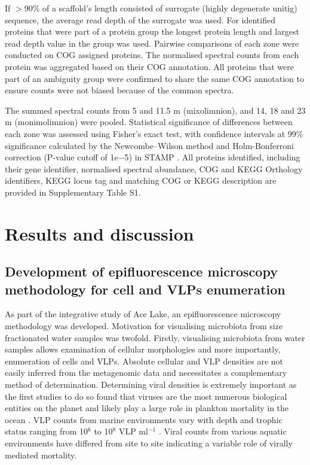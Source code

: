 If $>$90\% of a scaffold’s length consisted of surrogate (highly degenerate unitig) sequence, the average read depth of the surrogate was used. 
For identified proteins that were part of a protein group the longest protein length and largest read depth value in the group was used. 
Pairwise comparisons of each zone were conducted on \ac{COG} assigned proteins. 
The normalised spectral counts from each protein was aggregated based on their \ac{COG} annotation. 
All proteins that were part of an ambiguity group were confirmed to share the same \ac{COG} annotation to ensure counts were not biased because of the common spectra.

The summed spectral counts from 5 and 11.5 m (mixolimnion), and 14, 18 and 23 m (monimolimnion) were pooled. 
Statistical significance of differences between each zone was assessed using Fisher's exact test, with confidence intervals at 99\% significance calculated by the Newcombe–Wilson method and Holm-Bonferroni correction (P-value cutoff of 1e$-$5) in \ac{STAMP} \cite{Parks2010}. 
All proteins identified, including their gene identifier, normalised spectral abundance, \ac{COG} and \ac{KEGG} Orthology identifiers, \ac{KEGG} locus tag and matching \ac{COG} or \ac{KEGG} description are provided in Supplementary Table S1.




\section{Results and discussion}

\subsection[Epifluorescence microscopy methodology]{Development of epifluorescence microscopy methodology for cell and \acp{VLP} enumeration}
As part of the integrative study of Ace Lake, an epifluorescence microscopy methodology was developed.
Motivation for visualising microbiota from size fractionated water samples was twofold. 
Firstly, visualising microbiota from water samples allows examination of cellular morphologies and more importantly, enumeration of cells and \acp{VLP}.
Absolute cellular and \ac{VLP} densities are not easily inferred from the metagenomic data and necessitates a complementary method of determination.
Determining viral densities is extremely important as the first studies to do so found that viruses are the most numerous biological entities on the planet and likely play a large role in plankton mortality in the ocean \cite{Bergh1989,Proctor1990}. %
\ac{VLP} counts from marine environments vary with depth and trophic status ranging from 10$^6$ to 10$^8$ \acs{VLP} ml$^{-1}$ \cite{Suttle2005}. %
Viral counts from various aquatic environments have differed from site to site indicating a variable role of virally mediated mortality. %

